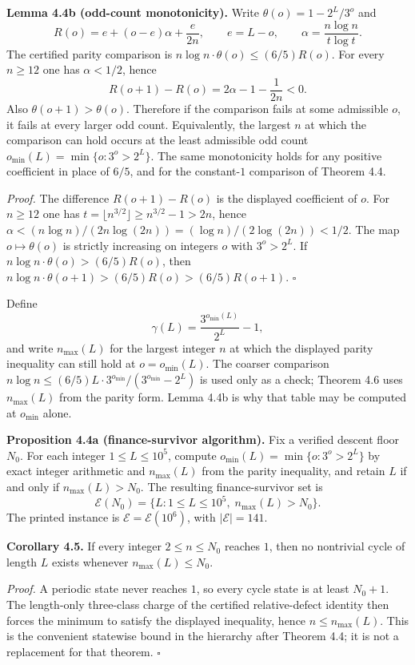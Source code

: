\documentclass[12pt]{article}
\begin{document}
\textbf{Lemma 4.4b (odd-count monotonicity).} Write
\(\theta(o)=1-2^L/3^o\) and \[
R(o)=e+(o-e)\alpha+\frac{e}{2n},
\qquad
e=L-o,
\qquad
\alpha=\frac{n\log n}{t\log t}.
\] The certified parity comparison is
\(n\log n\cdot\theta(o)\le(6/5)R(o)\). For every \(n\ge 12\) one has
\(\alpha<1/2\), hence \[
R(o+1)-R(o)=2\alpha-1-\frac1{2n}<0.
\] Also \(\theta(o+1)>\theta(o)\). Therefore if the comparison fails at
some admissible \(o\), it fails at every larger odd count. Equivalently,
the largest \(n\) at which the comparison can hold occurs at the least
admissible odd count \(o_{\min}(L)=\min\{o:3^o>2^L\}\). The same
monotonicity holds for any positive coefficient in place of \(6/5\), and
for the constant-\(1\) comparison of Theorem 4.4.

\emph{Proof.} The difference \(R(o+1)-R(o)\) is the displayed
coefficient of \(o\). For \(n\ge 12\) one has
\(t=\lfloor n^{3/2}\rfloor\ge n^{3/2}-1>2n\), hence
\(\alpha<(n\log n)/(2n\log(2n))=(\log n)/(2\log(2n))<1/2\). The map
\(o\mapsto\theta(o)\) is strictly increasing on integers \(o\) with
\(3^o>2^L\). If \(n\log n\cdot\theta(o)>(6/5)R(o)\), then
\(n\log n\cdot\theta(o+1)>(6/5)R(o)>(6/5)R(o+1)\). \(\square\)

Define \[
\gamma(L)=\frac{3^{o_{\min}(L)}}{2^L}-1,
\] and write \(n_{\max}(L)\) for the largest integer \(n\) at which the
displayed parity inequality can still hold at \(o=o_{\min}(L)\). The
coarser comparison
\(n\log n\le (6/5)L\cdot 3^{o_{\min}}/(3^{o_{\min}}-2^L)\) is used only
as a check; Theorem 4.6 uses \(n_{\max}(L)\) from the parity form. Lemma
4.4b is why that table may be computed at \(o_{\min}\) alone.

\textbf{Proposition 4.4a (finance-survivor algorithm).} Fix a verified
descent floor \(N_0\). For each integer \(1\le L\le 10^5\), compute
\(o_{\min}(L)=\min\{o:3^o>2^L\}\) by exact integer arithmetic and
\(n_{\max}(L)\) from the parity inequality, and retain \(L\) if and only
if \(n_{\max}(L)>N_0\). The resulting finance-survivor set is \[
\mathcal E(N_0)=\bigl\{L:1\le L\le 10^5,\; n_{\max}(L)>N_0\bigr\}.
\] The printed instance is \(\mathcal E=\mathcal E(10^6)\), with
\(\lvert\mathcal E\rvert=141\).

\textbf{Corollary 4.5.} If every integer \(2\le n\le N_0\) reaches
\(1\), then no nontrivial cycle of length \(L\) exists whenever
\(n_{\max}(L)\le N_0\).

\emph{Proof.} A periodic state never reaches \(1\), so every cycle state
is at least \(N_0+1\). The length-only three-class charge of the
certified relative-defect identity then forces the minimum to satisfy
the displayed inequality, hence \(n\le n_{\max}(L)\). This is the
convenient statewise bound in the hierarchy after Theorem 4.4; it is not
a replacement for that theorem. \(\square\)
\end{document}
